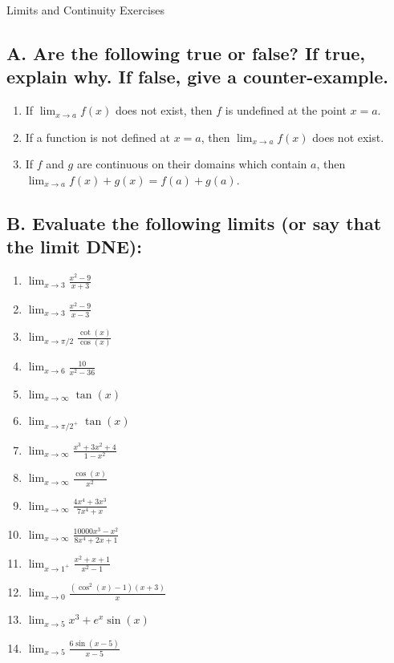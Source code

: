 \documentclass{article}
\begin{document}
\begin{center}
\begin{Huge}Limits and Continuity Exercises\end{Huge}
\end{center}


\subsection*{A. Are the following true or false? If true, explain why. If false, give a counter-example.}
\begin{enumerate}
\item If $\displaystyle\lim_{x\to a} f(x)$ does not exist, then $f$ is undefined at the point $x=a$.
\item If a function is not defined at $x=a$, then $\displaystyle\lim_{x\to a} f(x)$ does not exist.
\item If $f$ and $g$ are continuous on their domains which contain $a$, then $\displaystyle\lim_{x\to a} f(x) + g(x) = f(a) + g(a).$
\end{enumerate}


\subsection*{B. Evaluate the following limits (or say that the limit DNE):}

\begin{multicols}{4}

\begin{enumerate}
\item $\displaystyle\lim_{x\to 3}\frac{x^2-9}{x+3}$
\item $\displaystyle\lim_{x\to 3}\frac{x^2-9}{x-3}$
\item $\displaystyle\lim_{x\to \pi/2}\frac{\cot(x)}{\cos(x)}$
\item $\displaystyle\lim_{x\to 6}\frac{10}{x^2-36}$
\item $\displaystyle\lim_{x\to \infty}\tan(x)$
\item $\displaystyle\lim_{x\to\pi/2^+} \tan(x)$
\item $\displaystyle\lim_{x\to \infty}\frac{x^3+3x^2+4}{1-x^2}$
\item $\displaystyle\lim_{x\to \infty}\frac{\cos(x)}{x^2}$
\item $\displaystyle\lim_{x\to \infty}\frac{4x^4+3x^3}{7x^4+x}$
\item $\displaystyle\lim_{x\to \infty}\frac{10000x^3-x^2}{8x^4+2x+1}$
\item $\displaystyle\lim_{x \rightarrow 1^+} \frac{x^2+x+1}{x^2-1}$
\item $\displaystyle\lim_{x\to 0}\frac{(\cos^2(x) - 1)(x+3)}{x}$
\item $\displaystyle\lim_{x\to 5}x^3+e^x\sin(x)$
\item $\displaystyle\lim_{x\to 5}\frac{6\sin(x-5)}{x-5}$
\end{enumerate}

\end{multicols}
\end{document}
